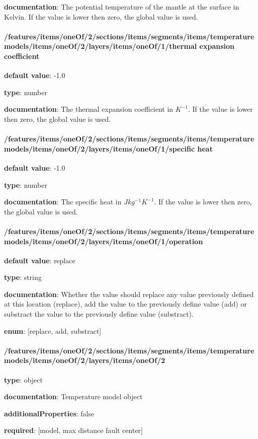 \begin{itemized}
\item {\bf documentation}: The potential temperature of the mantle at the surface in Kelvin. If the value is lower then zero, the global value is used.
\end{itemized}\paragraph{/features/items/oneOf/2/sections/items/segments/items/temperature models/items/oneOf/2/layers/items/oneOf/1/thermal expansion coefficient} \begin{itemized}
\item {\bf default value}: -1.0
\item {\bf type}: number
\item {\bf documentation}: The thermal expansion coefficient in $K^{-1}$. If the value is lower then zero, the global value is used.
\end{itemized}\paragraph{/features/items/oneOf/2/sections/items/segments/items/temperature models/items/oneOf/2/layers/items/oneOf/1/specific heat} \begin{itemized}
\item {\bf default value}: -1.0
\item {\bf type}: number
\item {\bf documentation}: The specific heat in $J kg^{-1} K^{-1}$. If the value is lower then zero, the global value is used.
\end{itemized}\paragraph{/features/items/oneOf/2/sections/items/segments/items/temperature models/items/oneOf/2/layers/items/oneOf/1/operation} \begin{itemized}
\item {\bf default value}: replace
\item {\bf type}: string
\item {\bf documentation}: Whether the value should replace any value previously defined at this location (replace), add the value to the previously define value (add) or substract the value to the previously define value (substract).
\item {\bf enum}: [replace, add, substract]\end{itemized}\paragraph{/features/items/oneOf/2/sections/items/segments/items/temperature models/items/oneOf/2/layers/items/oneOf/2} \begin{itemized}
\item {\bf type}: object
\item {\bf documentation}: Temperature model object
\item {\bf additionalProperties}: false
\item {\bf required}: [model, max distance fault center]\end{itemized}
